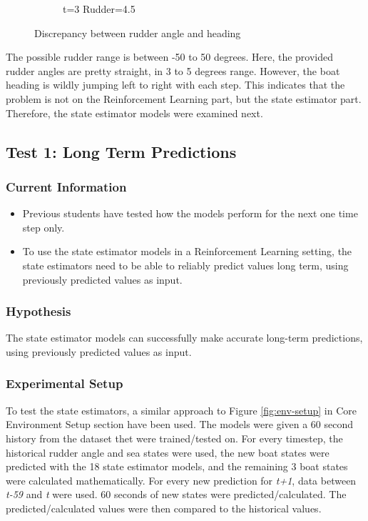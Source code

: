 \documentclass[12pt,twoside]{report}
\begin{document}
\begin{figure}[h]
\begin{subfigure}[b]{0.24\textwidth}
         \caption{t=3 Rudder=4.5}
     \end{subfigure}
        \caption{Discrepancy between rudder angle and heading}
        \label{fig:heading-problem}
\end{figure}

The possible rudder range is between -50 to 50 degrees. Here, the provided rudder angles are pretty straight, in 3 to 5 degrees range. However, the boat heading is wildly jumping left to right with each step. This indicates that the problem is not on the Reinforcement Learning part, but the state estimator part. Therefore, the state estimator models were examined next.

\subsection{Test 1: Long Term Predictions}
\label{sec:long-term-pred}

\subsubsection{Current Information}
\begin{itemize}
    \item Previous students have tested how the models perform for the next one time step only.
    \item To use the state estimator models in a Reinforcement Learning setting, the state estimators need to be able to reliably predict values long term, using previously predicted values as input.
\end{itemize}

\subsubsection{Hypothesis}
The state estimator models can successfully make accurate long-term predictions, using previously predicted values as input.

\subsubsection{Experimental Setup}
To test the state estimators, a similar approach to Figure \ref{fig:env-setup} in Core Environment Setup section have been used. The models were given a 60 second history from the dataset thet were trained/tested on. For every timestep, the historical rudder angle and sea states were used, the new boat states were predicted with the 18 state estimator models, and the remaining 3 boat states were calculated mathematically. For every new prediction for \textit{t+1}, data between \textit{t-59} and \textit{t} were used. 60 seconds of new states were predicted/calculated. The predicted/calculated values were then compared to the historical values.
\end{document}
